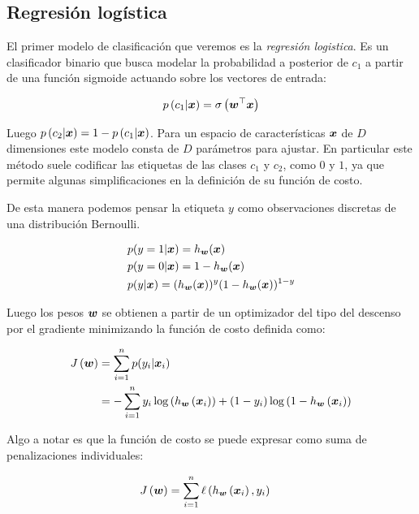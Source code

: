 \subsection{Regresión logística}

El primer modelo de clasificación que veremos es la \emph{regresión logistica}.
Es un clasificador binario que busca modelar la probabilidad a posterior de
$c_1$ a partir de una función sigmoide actuando sobre los vectores de entrada:

\begin{align}
    p\left( c_1 | \boldsymbol{x} \right) = \sigma\left( \boldsymbol{w}^{\top} \boldsymbol{x} \right)
\end{align}

Luego $p\left( c_2 | \boldsymbol{x} \right) = 1 - p\left( c_1 | \boldsymbol{x} \right)$.
Para un espacio de características $\boldsymbol{x}$ de $D$ dimensiones este modelo
consta de $D$ parámetros para ajustar. En particular este método suele codificar
las etiquetas de las clases $c_1$ y $c_2$, como $0$ y $1$, ya que permite
algunas simplificaciones en la definición de su función de costo.

De esta manera podemos pensar la etiqueta $y$ como observaciones discretas de
una distribución Bernoulli.

\begin{align}
    & p(y = 1 | \boldsymbol{x}) = h_{\boldsymbol{w}}(\boldsymbol{x}) \\
    & p(y = 0 | \boldsymbol{x}) = 1 - h_{\boldsymbol{w}}(\boldsymbol{x}) \\
    & p(y | \boldsymbol{x}) = (h_{\boldsymbol{w}}(\boldsymbol{x}))^{y}(1 - h_{\boldsymbol{w}}(\boldsymbol{x}))^{1 - y}
\end{align}

Luego los pesos $\boldsymbol{w}$ se obtienen a partir de un optimizador del tipo del
descenso por el gradiente minimizando la función de costo definida como:

\begin{align}
    J\left( \boldsymbol{w} \right) &= \sum_{i=1}^{n} p(y_{i} | \boldsymbol{x}_{i}) \\
                             &= -\sum_{i=1}^{n}
                                    y_{i}\log\left( h_{\boldsymbol{w}}\left( \boldsymbol{x}_{i} \right) \right) +
                                    (1 - y_{i})\log\left(1 - h_{\boldsymbol{w}}\left( \boldsymbol{x}_{i} \right) \right)
\end{align}

Algo a notar es que la función de costo se puede expresar como suma de
penalizaciones individuales:

\begin{align}
    J\left( \boldsymbol{w} \right) &= \sum_{i=1}^{n} \ell\left( h_{\boldsymbol{w}}\left( \boldsymbol{x}_{i}\right), y_{i}\right)
\end{align}

